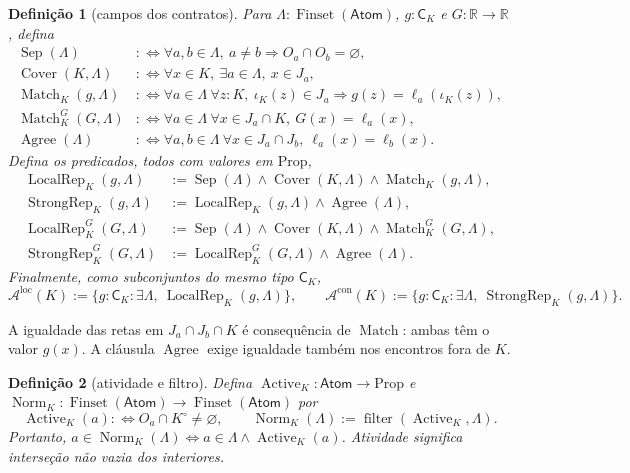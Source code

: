 \documentclass[11pt,a4paper]{article}
\newtheorem{definicao}{Definição}[section]
\newcommand{\R}{\mathbb R}
\newcommand{\Atoms}{\mathsf{Atom}}
\newcommand{\CK}{\mathsf C_K}
\newcommand{\FS}{\operatorname{Finset}}
\newcommand{\Norm}{\operatorname{Norm}}
\newcommand{\Act}{\operatorname{Active}}
\newcommand{\Sep}{\operatorname{Sep}}
\newcommand{\Cov}{\operatorname{Cover}}
\newcommand{\Match}{\operatorname{Match}}
\newcommand{\Agree}{\operatorname{Agree}}
\newcommand{\Loc}{\operatorname{LocalRep}}
\newcommand{\Str}{\operatorname{StrongRep}}
\newcommand{\Aloc}{\mathcal A^{\mathrm{loc}}}
\newcommand{\Astr}{\mathcal A^{\mathrm{con}}}
\begin{document}
\begin{definicao}[campos dos contratos]\label{def:contracts}
Para $\Lambda:\FS(\Atoms)$, $g:\CK$ e $G:\R\to\R$, defina
\begin{align*}
 \Sep(\Lambda)&:\Longleftrightarrow
  \forall a,b\in\Lambda,\ a\ne b\Rightarrow O_a\cap O_b=\varnothing,\\
 \Cov(K,\Lambda)&:\Longleftrightarrow
  \forall x\in K,\ \exists a\in\Lambda,\ x\in J_a,\\
 \Match_K(g,\Lambda)&:\Longleftrightarrow
  \forall a\in\Lambda\ \forall z:K,\
       \iota_K(z)\in J_a\Rightarrow g(z)=\ell_a(\iota_K(z)),\\
 \Match^G_K(G,\Lambda)&:\Longleftrightarrow
  \forall a\in\Lambda\ \forall x\in J_a\cap K,\ G(x)=\ell_a(x),\\
 \Agree(\Lambda)&:\Longleftrightarrow
  \forall a,b\in\Lambda\ \forall x\in J_a\cap J_b,\
       \ell_a(x)=\ell_b(x).
\end{align*}
Defina os predicados, todos com valores em $\mathrm{Prop}$,
\begin{align*}
 \Loc_K(g,\Lambda)&:=\Sep(\Lambda)\land\Cov(K,\Lambda)
                         \land\Match_K(g,\Lambda),\\
 \Str_K(g,\Lambda)&:=\Loc_K(g,\Lambda)\land\Agree(\Lambda),\\
 \Loc^G_K(G,\Lambda)&:=\Sep(\Lambda)\land\Cov(K,\Lambda)
                         \land\Match^G_K(G,\Lambda),\\
 \Str^G_K(G,\Lambda)&:=\Loc^G_K(G,\Lambda)\land\Agree(\Lambda).
\end{align*}
Finalmente, como subconjuntos do mesmo tipo $\CK$,
\[
 \Aloc(K):=\{g:\CK:\exists\Lambda,\ \Loc_K(g,\Lambda)\},\qquad
 \Astr(K):=\{g:\CK:\exists\Lambda,\ \Str_K(g,\Lambda)\}.
\]
\end{definicao}

A igualdade das retas em $J_a\cap J_b\cap K$ é consequência de
$\Match$: ambas têm o valor $g(x)$. A cláusula $\Agree$ exige
igualdade também nos encontros fora de $K$.

\begin{definicao}[atividade e filtro]\label{def:norm}
Defina $\Act_K:\Atoms\to\mathrm{Prop}$ e
$\Norm_K:\FS(\Atoms)\to\FS(\Atoms)$ por
\[
 \Act_K(a):\Longleftrightarrow O_a\cap K^\circ\ne\varnothing,
 \qquad \Norm_K(\Lambda):=\operatorname{filter}(\Act_K,\Lambda).
\]
Portanto,
$a\in\Norm_K(\Lambda)\Longleftrightarrow a\in\Lambda\land\Act_K(a)$.
Atividade significa interseção não vazia dos interiores.
\end{definicao}
\end{document}
